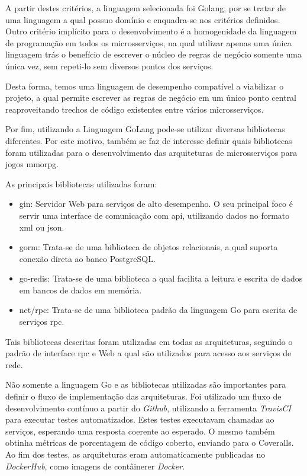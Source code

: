 A partir destes critérios, a linguagem selecionada foi Golang, por se tratar de uma linguagem a qual possuo domínio e enquadra-se nos critérios definidos.
%
Outro critério implícito para o desenvolvimento é a homogenidade da linguagem de programação em todos os microsserviços, na qual utilizar apenas uma única linguagem trás o benefício de escrever o núcleo de regras de negócio somente uma única vez, sem repeti-lo sem diversos pontos dos serviços.

Desta forma, temos uma linguagem de desempenho compatível a viabilizar o projeto, a qual permite escrever as regras de negócio em um único ponto central reaproveitando trechos de código existentes entre vários microsserviços.

Por fim, utilizando a Linguagem GoLang pode-se utilizar diversas bibliotecas diferentes. Por este motivo, também se faz de interesse definir quais bibliotecas foram utilizadas para o desenvolvimento das arquiteturas de microsserviços para jogos \ac{mmorpg}.

As principais bibliotecas utilizadas foram:

\begin{itemize}
  \item gin: Servidor Web para serviços de alto desempenho. O seu principal foco é servir uma interface de comunicação com \ac{api}, utilizando dados no formato \ac{xml} ou \ac{json}.
  \item gorm: Trata-se de uma biblioteca de objetos relacionais, a qual suporta conexão direta ao banco PostgreSQL.
  \item go-redis: Trata-se de uma biblioteca a qual facilita a leitura e escrita de dados em bancos de dados em memória.
  \item net/rpc: Trata-se de uma biblioteca padrão da linguagem Go para escrita de serviços \ac{rpc}.
\end{itemize}

Tais bibliotecas descritas foram utilizadas em todas as arquiteturas, seguindo o padrão de interface \ac{rpc} e Web a qual são utilizados para acesso aos serviços de rede.

Não somente a linguagem Go e as bibliotecas utilizadas são importantes para definir o fluxo de implementação das arquiteturas.
%
Foi utilizado um fluxo de desenvolvimento contínuo a partir do \textit{Github}, utilizando a ferramenta \textit{TravisCI} para executar testes automatizados. Estes testes executavam chamadas ao serviços, esperando uma resposta coerente ao esperado. O mesmo também obtinha métricas de porcentagem de código coberto, enviando para o Coveralls.
%
Ao fim dos testes, as arquiteturas eram automaticamente publicadas no \textit{DockerHub}, como imagens de contâinerer \textit{Docker}.

